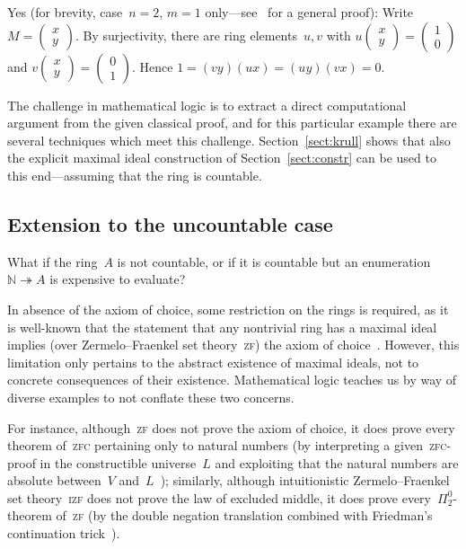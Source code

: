 \documentclass[com,11pt,crcready]{iosart2x}
\theoremstyle{definition}
\theoremstyle{plain}
\theoremstyle{remark}
\newcommand{\NN}{\mathbb{N}}
\renewcommand{\_}{\mathpunct{.}\,}
\begin{document}
Yes (for brevity, case~$n = 2$, $m = 1$ only---see~\cite{richman:trivial-rings} for a general proof): Write~$M =
\left(\begin{smallmatrix}x\\y\end{smallmatrix}\right)$. By surjectivity,
there are ring elements~$u, v$ with
$
  u \left(\begin{smallmatrix}x\\y\end{smallmatrix}\right) = \left(\begin{smallmatrix}1\\0\end{smallmatrix}\right)
$
and
$
  v \left(\begin{smallmatrix}x\\y\end{smallmatrix}\right) = \left(\begin{smallmatrix}0\\1\end{smallmatrix}\right)
$.
Hence $1 = (vy) (ux) = (uy) (vx) = 0$.

The challenge in mathematical logic is to extract a direct computational
argument from the given classical proof, and for this particular example
there are several techniques which meet this challenge. Section~\ref{sect:krull} shows that
also the explicit maximal ideal construction of Section~\ref{sect:constr} can be used to this end---assuming
that the ring is countable.


\subsection*{Extension to the uncountable case}

What if the ring~$A$ is not countable, or if it is countable but
an enumeration~$\NN \twoheadrightarrow A$ is expensive to
evaluate?

In absence of the axiom of choice, some restriction on the
rings is required, as it is well-known that the statement that any nontrivial
ring has a maximal ideal implies (over Zermelo--Fraenkel set
theory~\textsc{zf}) the axiom of choice~\cite{scott:prime-ideals,hodges:krull,banaschewski:krull,erne:krull,howard-rubin:ac}.
However, this limitation only pertains to the abstract existence of maximal
ideals, not to concrete consequences of their existence. Mathematical
logic teaches us by way of diverse examples to not conflate these two concerns.

For
instance, although~\textsc{zf} does not prove the axiom of choice, it does
prove every theorem of~\textsc{zfc} pertaining only to natural numbers (by
interpreting a given~\textsc{zfc}-proof in the constructible universe~$L$
and exploiting that the natural numbers are absolute between~$V$
and~$L$~\cite{goedel:ac-gch,schoenfield:predicativity}); similarly, although intuitionistic Zermelo--Fraenkel set
theory~\textsc{izf} does not prove the law of excluded middle, it does prove
every~$\Pi^0_2$-theorem of~\textsc{zf} (by the double negation translation
combined with Friedman's continuation trick~\cite{friedman:double-negation-translation}).
\end{document}

